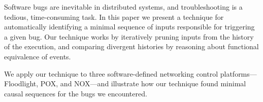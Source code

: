 Software bugs are inevitable in distributed systems, and troubleshooting
is a tedious, time-consuming task.
In this paper we present a technique for automatically identifying
a minimal sequence of inputs responsible for triggering a given bug.
Our technique works by
iteratively pruning inputs from the history of the execution, and
comparing divergent histories
by reasoning about functional equivalence of events.

We apply our technique to three software-defined networking control
platforms---Floodlight, POX, and NOX---and
illustrate how our technique found minimal causal sequences for
the bugs we encountered.
